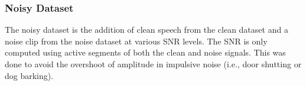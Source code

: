\subsubsection{Noisy Dataset}
The noisy dataset is the addition of clean speech from the clean dataset and a noise clip from the noise dataset at various SNR levels. The SNR is only computed using active segments of both the clean and noise signals. This was done to avoid the overshoot of amplitude in impulsive noise (i.e., door shutting or dog barking).
